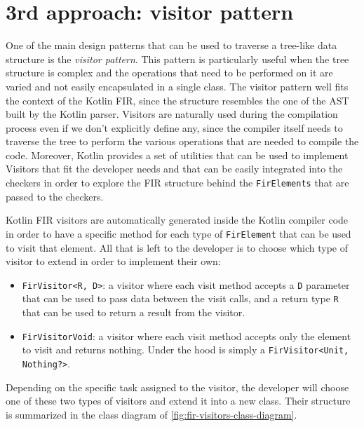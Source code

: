 \documentclass[12pt,a4paper,openright,twoside]{book}
\begin{document}
\section{3rd approach: visitor pattern}

One of the main design patterns that can be used to traverse a tree-like data 
structure is the \emph{visitor pattern}. This pattern is particularly useful 
when the tree structure is complex and the operations that need to be performed
on it are varied and not easily encapsulated in a single class.
%
The visitor pattern well fits the context of the Kotlin \ac{FIR}, since the
structure resembles the one of the \ac{AST} built by the Kotlin parser. 
Visitors are naturally used during the compilation process even if we don't
explicitly define any, since the compiler itself needs to traverse the tree to
perform the various operations that are needed to compile the code.
%
Moreover, Kotlin provides a set of utilities that can be used to implement
Visitors that fit the developer needs and that can be easily integrated into the
checkers in order to explore the \ac{FIR} structure behind the
\lstinline{FirElements} that are passed to the checkers.

Kotlin \ac{FIR} visitors are automatically generated inside the Kotlin compiler 
code in order to have a specific method for each type of \lstinline{FirElement}
that can be used to visit that element. All that is left to the developer is to
choose which type of visitor to extend in order to implement their own:

\begin{itemize}
  \item \lstinline{FirVisitor<R, D>}: a visitor where each visit method accepts
a \lstinline{D} parameter that can be used to pass data between the visit calls,
and a return type \lstinline{R} that can be used to return a result from the 
visitor.
  \item \lstinline{FirVisitorVoid}: a visitor where each visit method accepts
only the element to visit and returns nothing. Under the hood is simply a 
\lstinline{FirVisitor<Unit, Nothing?>}.
\end{itemize}

Depending on the specific task assigned to the visitor, the developer will
choose one of these two types of visitors and extend it into a new class. Their
structure is summarized in the class diagram of
\cref{fig:fir-visitors-class-diagram}.
\end{document}
